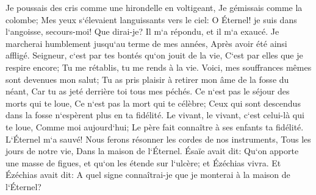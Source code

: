 \verse Je poussais des cris comme une hirondelle en voltigeant, Je gémissais comme la colombe; Mes yeux s`élevaient languissants vers le ciel: O Éternel! je suis dans l`angoisse, secours-moi! 
\verse Que dirai-je? Il m`a répondu, et il m`a exaucé. Je marcherai humblement jusqu`au terme de mes années, Après avoir été ainsi affligé. 
\verse Seigneur, c`est par tes bontés qu`on jouit de la vie, C`est par elles que je respire encore; Tu me rétablis, tu me rends à la vie. 
\verse Voici, mes souffrances mêmes sont devenues mon salut; Tu as pris plaisir à retirer mon âme de la fosse du néant, Car tu as jeté derrière toi tous mes péchés. 
\verse Ce n`est pas le séjour des morts qui te loue, Ce n`est pas la mort qui te célèbre; Ceux qui sont descendus dans la fosse n`espèrent plus en ta fidélité. 
\verse Le vivant, le vivant, c`est celui-là qui te loue, Comme moi aujourd`hui; Le père fait connaître à ses enfants ta fidélité. 
\verse L`Éternel m`a sauvé! Nous ferons résonner les cordes de nos instruments, Tous les jours de notre vie, Dans la maison de l`Éternel. 
\verse Ésaïe avait dit: Qu`on apporte une masse de figues, et qu`on les étende sur l`ulcère; et Ézéchias vivra. 
\verse Et Ézéchias avait dit: A quel signe connaîtrai-je que je monterai à la maison de l`Éternel? 

